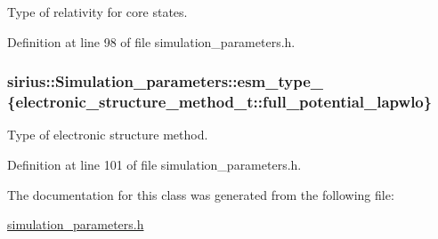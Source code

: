 Type of relativity for core states. 



Definition at line 98 of file simulation\+\_\+parameters.\+h.

\hypertarget{classsirius_1_1_simulation__parameters_a5f94855bdb699dad9f51ec2b5549d127}{}
\subsubsection[{esm\+\_\+type\+\_\+}]{ sirius\+::\+Simulation\+\_\+parameters\+::esm\+\_\+type\+\_\+ \{{\bf electronic\+\_\+structure\+\_\+method\+\_\+t\+::full\+\_\+potential\+\_\+lapwlo}\}\hspace{0.3cm}{\ttfamily [protected]}}\label{classsirius_1_1_simulation__parameters_a5f94855bdb699dad9f51ec2b5549d127}


Type of electronic structure method. 



Definition at line 101 of file simulation\+\_\+parameters.\+h.



The documentation for this class was generated from the following file\+:\begin{DoxyCompactItemize}
\item 
\hyperlink{simulation__parameters_8h}{simulation\+\_\+parameters.\+h}\end{DoxyCompactItemize}
